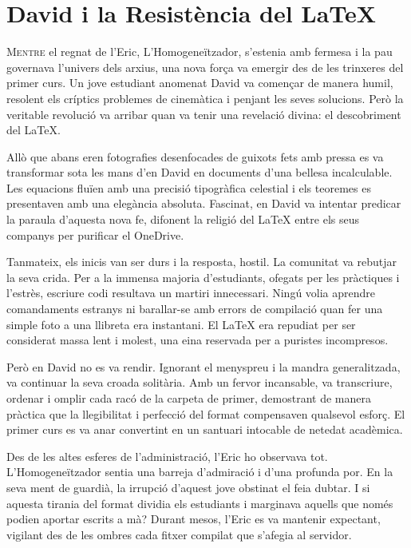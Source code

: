 \chapter{David i la Resistència del LaTeX}


\lettrine[loversize=0.2, lines=2]{M}{entre} el regnat de l'Eric, L'Homogeneïtzador, s'estenia amb fermesa i la pau governava l'univers dels arxius, una nova força va emergir des de les trinxeres del primer curs. Un jove estudiant anomenat David va començar de manera humil, resolent els críptics problemes de cinemàtica i penjant les seves solucions. Però la veritable revolució va arribar quan va tenir una revelació divina: el descobriment del LaTeX.

Allò que abans eren fotografies desenfocades de guixots fets amb pressa es va transformar sota les mans d'en David en documents d'una bellesa incalculable. Les equacions fluïen amb una precisió tipogràfica celestial i els teoremes es presentaven amb una elegància absoluta. Fascinat, en David va intentar predicar la paraula d'aquesta nova fe, difonent la religió del LaTeX entre els seus companys per purificar el OneDrive.

Tanmateix, els inicis van ser durs i la resposta, hostil. La comunitat va rebutjar la seva crida. Per a la immensa majoria d'estudiants, ofegats per les pràctiques i l'estrès, escriure codi resultava un martiri innecessari. Ningú volia aprendre comandaments estranys ni barallar-se amb errors de compilació quan fer una simple foto a una llibreta era instantani. El LaTeX era repudiat per ser considerat massa lent i molest, una eina reservada per a puristes incompresos.

Però en David no es va rendir. Ignorant el menyspreu i la mandra generalitzada, va continuar la seva croada solitària. Amb un fervor incansable, va transcriure, ordenar i omplir cada racó de la carpeta de primer, demostrant de manera pràctica que la llegibilitat i perfecció del format compensaven qualsevol esforç. El primer curs es va anar convertint en un santuari intocable de netedat acadèmica.

Des de les altes esferes de l'administració, l'Eric ho observava tot. L'Homogeneïtzador sentia una barreja d'admiració i d'una profunda por. En la seva ment de guardià, la irrupció d'aquest jove obstinat el feia dubtar. I si aquesta tirania del format dividia els estudiants i marginava aquells que només podien aportar escrits a mà? Durant mesos, l'Eric es va mantenir expectant, vigilant des de les ombres cada fitxer compilat que s'afegia al servidor.

